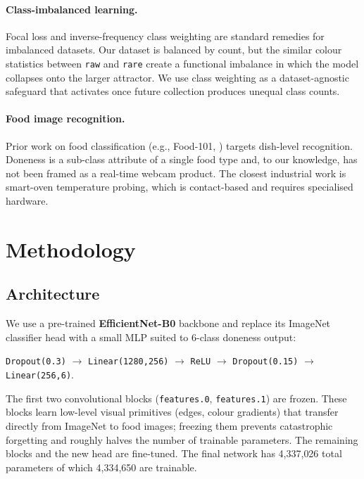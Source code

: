 \documentclass{article}
\begin{document}
\paragraph{Class-imbalanced learning.} Focal loss \citep{lin2017focal} and
inverse-frequency class weighting are standard remedies for imbalanced datasets.
Our dataset is balanced by count, but the similar colour statistics
between \texttt{raw} and \texttt{rare} create a functional
imbalance in which the model collapses onto the larger attractor. We use class
weighting as a dataset-agnostic safeguard that activates once future
collection produces unequal class counts.

\paragraph{Food image recognition.} Prior work on food classification
(e.g., Food-101, \citet{bossard2014food}) targets dish-level recognition.
Doneness is a sub-class attribute of a single food type and, to our
knowledge, has not been framed as a real-time webcam product. The closest
industrial work is smart-oven temperature probing, which is contact-based and
requires specialised hardware.

\section{Methodology}
\label{sec:method}

\subsection{Architecture}
\label{sec:method-arch}
We use a pre-trained \textbf{EfficientNet-B0} backbone
\citep{tan2019efficientnet} and replace its ImageNet classifier head with a
small MLP suited to 6-class doneness output:

\begin{center}
\texttt{Dropout(0.3)} $\rightarrow$ \texttt{Linear(1280,256)} $\rightarrow$
\texttt{ReLU} $\rightarrow$ \texttt{Dropout(0.15)} $\rightarrow$
\texttt{Linear(256,6)}.
\end{center}

The first two convolutional blocks (\texttt{features.0}, \texttt{features.1})
are frozen. These blocks learn low-level visual primitives (edges, colour
gradients) that transfer directly from ImageNet to food images; freezing them
prevents catastrophic forgetting and roughly halves the number of trainable
parameters. The remaining blocks and the new head are fine-tuned. The final
network has 4{,}337{,}026 total parameters of which 4{,}334{,}650 are trainable.
\end{document}
